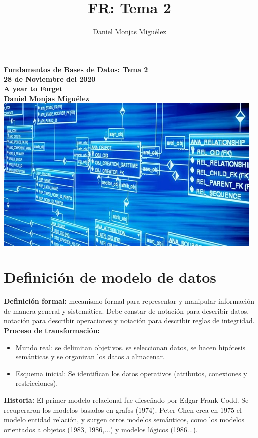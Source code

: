 \documentclass[a4paper,11pt]{article}
\author{Daniel Monjas Miguélez}
\title{FR: Tema 2}
\begin{document}
\begin{titlepage}
\centering
    \vfill
    {\bfseries\Large
        Fundamentos de Bases de Datos: Tema 2\\
        28 de Noviembre del 2020\\
        A year to Forget \\
        \vskip2cm
        Daniel Monjas Miguélez\\
    }    
    \vfill
    \includegraphics[width=13cm]{bases_datos.jpg}
    \vfill
    \vfill
\end{titlepage}

\newpage
\tableofcontents
\newpage

\section{Definición de modelo de datos}
\textbf{Definición formal:} mecanismo formal para representar y manipular información de manera general y sistemática. Debe constar de notación para describir datos, notación para describir operaciones y notación para describir reglas de integridad. \\

\textbf{Proceso de transformación:}

\begin{itemize}
\item Mundo real: se delimitan objetivos, se seleccionan datos, se hacen hipótesis semánticas y se organizan los datos a almacenar.

\item Esquema inicial: Se identifican los datos operativos (atributos, conexiones y restricciones).
\end{itemize}

\textbf{Historia:} El primer modelo relacional fue dieseñado por Edgar Frank Codd. Se recuperaron los modelos basados en grafos (1974). Peter Chen crea en 1975 el modelo entidad relación, y surgen otros modelos semánticos, como los modelos orientados a objetos (1983, 1986,...) y modelos lógicos (1986...). \\
\end{document}
